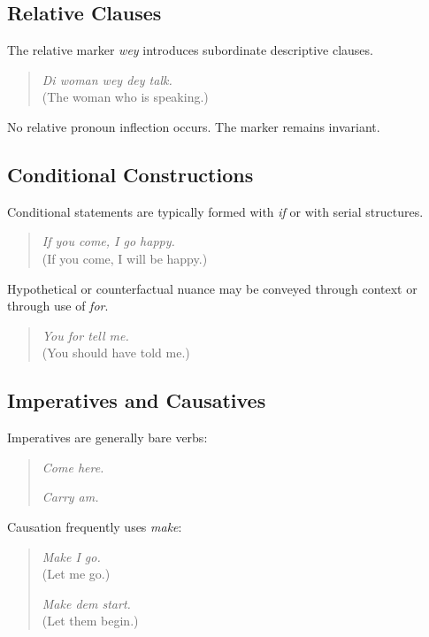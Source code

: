 \documentclass[12pt]{article}
\begin{document}
\subsection{Relative Clauses}

The relative marker \textit{wey} introduces subordinate descriptive clauses.

\begin{quote}
\textit{Di woman wey dey talk.} \\
(The woman who is speaking.)
\end{quote}

No relative pronoun inflection occurs. The marker remains invariant.

\subsection{Conditional Constructions}

Conditional statements are typically formed with \textit{if} or with serial structures.

\begin{quote}
\textit{If you come, I go happy.} \\
(If you come, I will be happy.)
\end{quote}

Hypothetical or counterfactual nuance may be conveyed through context or through use of \textit{for}.

\begin{quote}
\textit{You for tell me.} \\
(You should have told me.)
\end{quote}

\subsection{Imperatives and Causatives}

Imperatives are generally bare verbs:

\begin{quote}
\textit{Come here.}

\textit{Carry am.}
\end{quote}

Causation frequently uses \textit{make}:

\begin{quote}
\textit{Make I go.} \\
(Let me go.)

\textit{Make dem start.} \\
(Let them begin.)
\end{quote}
\end{document}
